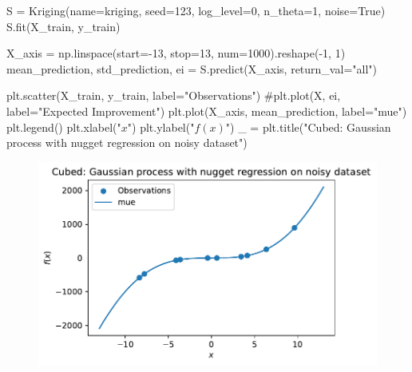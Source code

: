 \documentclass[
  letterpaper,
  DIV=11,
  numbers=noendperiod]{scrreprt}
\newenvironment{Shaded}{\begin{snugshade}}{\end{snugshade}}
\newcommand{\CommentTok}[1]{\textcolor[rgb]{0.37,0.37,0.37}{#1}}
\newcommand{\DecValTok}[1]{\textcolor[rgb]{0.68,0.00,0.00}{#1}}
\newcommand{\NormalTok}[1]{\textcolor[rgb]{0.00,0.23,0.31}{#1}}
\newcommand{\OperatorTok}[1]{\textcolor[rgb]{0.37,0.37,0.37}{#1}}
\newcommand{\StringTok}[1]{\textcolor[rgb]{0.13,0.47,0.30}{#1}}
\newcommand{\VariableTok}[1]{\textcolor[rgb]{0.07,0.07,0.07}{#1}}
\begin{document}
\begin{Shaded}
\begin{Highlighting}[]
\NormalTok{S }\OperatorTok{=}\NormalTok{ Kriging(name}\OperatorTok{=}\StringTok{\textquotesingle{}kriging\textquotesingle{}}\NormalTok{,  seed}\OperatorTok{=}\DecValTok{123}\NormalTok{, log\_level}\OperatorTok{=}\DecValTok{0}\NormalTok{, n\_theta}\OperatorTok{=}\DecValTok{1}\NormalTok{, noise}\OperatorTok{=}\VariableTok{True}\NormalTok{)}
\NormalTok{S.fit(X\_train, y\_train)}

\NormalTok{X\_axis }\OperatorTok{=}\NormalTok{ np.linspace(start}\OperatorTok{={-}}\DecValTok{13}\NormalTok{, stop}\OperatorTok{=}\DecValTok{13}\NormalTok{, num}\OperatorTok{=}\DecValTok{1000}\NormalTok{).reshape(}\OperatorTok{{-}}\DecValTok{1}\NormalTok{, }\DecValTok{1}\NormalTok{)}
\NormalTok{mean\_prediction, std\_prediction, ei }\OperatorTok{=}\NormalTok{ S.predict(X\_axis, return\_val}\OperatorTok{=}\StringTok{"all"}\NormalTok{)}

\NormalTok{plt.scatter(X\_train, y\_train, label}\OperatorTok{=}\StringTok{"Observations"}\NormalTok{)}
\CommentTok{\#plt.plot(X, ei, label="Expected Improvement")}
\NormalTok{plt.plot(X\_axis, mean\_prediction, label}\OperatorTok{=}\StringTok{"mue"}\NormalTok{)}
\NormalTok{plt.legend()}
\NormalTok{plt.xlabel(}\StringTok{"$x$"}\NormalTok{)}
\NormalTok{plt.ylabel(}\StringTok{"$f(x)$"}\NormalTok{)}
\NormalTok{\_ }\OperatorTok{=}\NormalTok{ plt.title(}\StringTok{"Cubed: Gaussian process with nugget regression on noisy dataset"}\NormalTok{)}
\end{Highlighting}
\end{Shaded}

\begin{figure}[H]

{\centering \includegraphics{012_num_spot_ei_files/figure-pdf/cell-55-output-1.pdf}

}

\end{figure}
\end{document}
